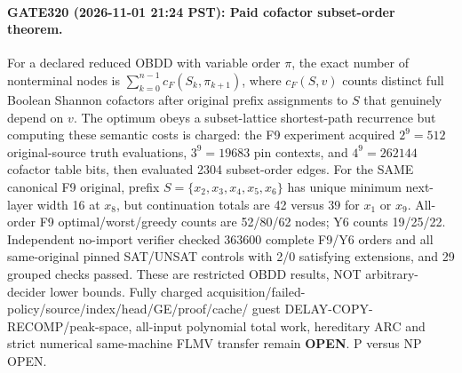 \paragraph{GATE320 (2026-11-01 21:24 PST): Paid cofactor subset-order theorem.}
For a declared reduced OBDD with variable order $\pi$, the exact
number of nonterminal nodes is
$\sum_{k=0}^{n-1}c_F(S_k,\pi_{k+1})$, where
$c_F(S,v)$ counts distinct full Boolean Shannon cofactors after original
prefix assignments to $S$ that genuinely depend on $v$.
The optimum obeys a subset-lattice shortest-path recurrence but computing
these semantic costs is charged: the F9 experiment acquired $2^9=512$
original-source truth evaluations, $3^9=19683$ pin contexts, and
$4^9=262144$ cofactor table bits, then evaluated 2304 subset-order edges.
For the SAME canonical F9 original, prefix $S=\{x_2,x_3,x_4,x_5,x_6\}$
has unique minimum next-layer width 16 at $x_8$, but continuation
totals are 42 versus 39 for $x_1$ or $x_9$.
All-order F9 optimal/worst/greedy counts are 52/80/62 nodes;
Y6 counts 19/25/22. Independent no-import verifier checked
363600 complete F9/Y6 orders and all same-original pinned SAT/UNSAT
controls with 2/0 satisfying extensions, and 29 grouped checks passed.
These are restricted OBDD results, NOT arbitrary-decider lower bounds.
Fully charged acquisition/failed-policy/source/index/head/GE/proof/cache/
guest DELAY-COPY-RECOMP/peak-space, all-input polynomial total work,
hereditary ARC and strict numerical same-machine FLMV transfer remain
\textbf{OPEN}. P versus NP OPEN.
